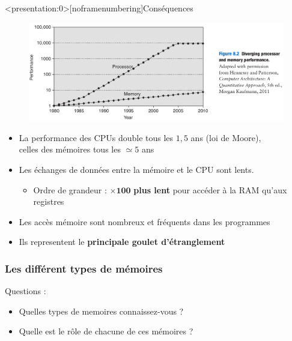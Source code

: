 \documentclass[8pt]{beamer}
\begin{document}
\begin{frame}<presentation:0>[noframenumbering]{Cons\'equences}
    \begin{figure}[ht]
        \centering
        \centering
        \includegraphics[width=.75\linewidth]{figures/gap_cpu_ram_H.png}
        \label{fig:sub2}
    \end{figure}
    \begin{itemize}
        \item La performance des CPUs double tous les $1,5$ ans (loi de Moore),
              \\ celles des mémoires tous les $\simeq5$ ans
        \item Les \'echanges de données entre la mémoire et le CPU sont
              lents.
              \begin{itemize}
                  \item Ordre de grandeur : $\boldsymbol{\times}\textbf{100}$
                        \textbf{plus
                            lent}
                        pour
                        accéder
                        à la RAM qu'aux registres
              \end{itemize}
        \item Les acc\`es mémoire sont nombreux et fréquents dans les
              programmes
        \item Ils representent le \textbf{principale goulet d'\'etranglement}
    \end{itemize}
\end{frame}

\begin{frame}
    \frametitle{Les différent types de mémoires}
    \begin{alertblock}{Questions :}
        \begin{itemize}
            \item Quelles types de memoires connaissez-vous ?
            \item Quelle est le r\^ole de chacune de ces m\'emoires ?
        \end{itemize}
    \end{alertblock}
\end{frame}
\end{document}
